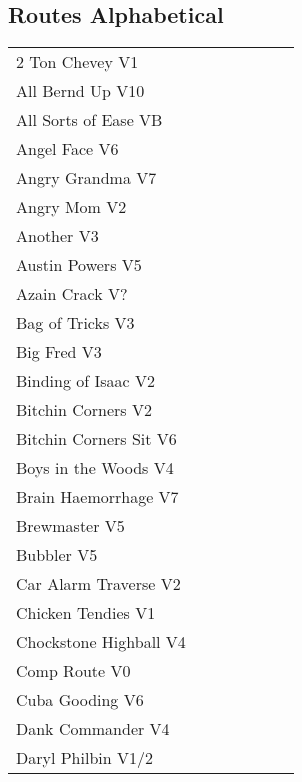 \twocolumn
{}
\begin{flushleft}
\section{Routes Alphabetical}
\begin{center}
\begin{supertabular}{p{0.65\linewidth}r}
2 Ton Chevey V1 & \pageref{rt:2 Ton Chevey} \\
All Bernd Up V10 & \pageref{rt:All Bernd Up} \\
All Sorts of Ease VB & \pageref{rt:All Sorts of Ease} \\
Angel Face V6 & \pageref{rt:Angel Face} \\
Angry Grandma V7 & \pageref{rt:Angry Grandma} \\
Angry Mom V2 & \pageref{rt:Angry Mom} \\
Another V3 & \pageref{rt:Another} \\
Austin Powers V5 & \pageref{rt:Austin Powers} \\
Azain Crack V? & \pageref{rt:Azain Crack} \\
Bag of Tricks V3 & \pageref{vr:Bag of Tricks} \\
Big Fred V3 & \pageref{rt:Big Fred} \\
Binding of Isaac V2 & \pageref{rt:Binding of Isaac} \\
Bitchin Corners V2 & \pageref{rt:Bitchin Corners} \\
Bitchin Corners Sit V6 & \pageref{vr:Bitchin Corners Sit} \\
Boys in the Woods V4 & \pageref{rt:Boys in the Woods} \\
Brain Haemorrhage V7 & \pageref{vr:Brain Haemorrhage} \\
Brewmaster V5 & \pageref{rt:Brewmaster} \\
Bubbler V5 & \pageref{rt:Bubbler} \\
Car Alarm Traverse V2 & \pageref{rt:Car Alarm Traverse} \\
Chicken Tendies V1 & \pageref{rt:Chicken Tendies} \\
Chockstone Highball V4 & \pageref{rt:Chockstone Highball} \\
Comp Route V0 & \pageref{rt:Comp Route} \\
Cuba Gooding V6 & \pageref{rt:Cuba Gooding} \\
Dank Commander V4 & \pageref{rt:Dank Commander} \\
Daryl Philbin V1/2 & \pageref{rt:Daryl Philbin} \\

\end{supertabular}
\end{center}
\end{flushleft}
